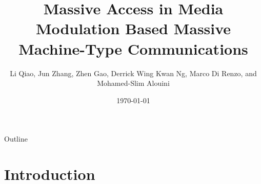 \documentclass[9pt]{beamer}
\begin{document}
\title[Li Qiao] %
{Massive Access in Media Modulation Based Massive Machine-Type Communications}


\author[Beijing Institute of Technology] %
{Li Qiao, Jun Zhang, Zhen Gao, Derrick Wing Kwan Ng, Marco Di Renzo, and Mohamed-Slim Alouini}


\date{\today}





\begin{frame}
  \titlepage
\end{frame}

\begin{frame}{Outline}
	\vskip 2mm
	\hfill	{\large \parbox{.95\textwidth}{\tableofcontents[hideothersubsections]}}
\end{frame}

\section{Introduction}
\end{document}
